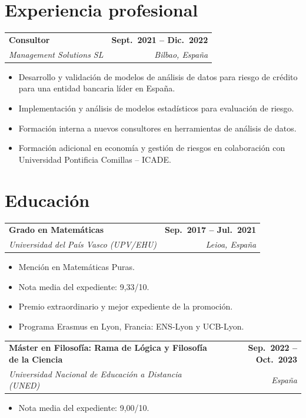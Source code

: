 \documentclass[11pt, a4paper]{article}
\makeatletter
\newcommand{\cventry}[4]{%
  \noindent
  \begin{tabularx}{\linewidth}{@{}X r@{}}
    \textbf{#1} & \textbf{#2}\\
    \textit{#3} & \textit{#4}
  \end{tabularx}%
}
\makeatother
\begin{document}
\newpage

\section{Experiencia profesional}

\cventry{Consultor}%
        {Sept.\ 2021 -- Dic.\ 2022}%
        {Management Solutions SL}%
        {Bilbao, España}
\begin{itemize}[nosep, leftmargin=1.2em, topsep=4pt]
  \item Desarrollo y validación de modelos de análisis de datos para riesgo
        de crédito para una entidad bancaria líder en España.
  \item Implementación y análisis de modelos estadísticos para evaluación de riesgo.
  \item Formación interna a nuevos consultores en herramientas de análisis de datos.
  \item Formación adicional en economía y gestión de riesgos en colaboración con
        Universidad Pontificia Comillas -- ICADE.
\end{itemize}


\section{Educación}



\medskip
\cventry{Grado en Matemáticas}%
        {Sep.\ 2017 -- Jul.\ 2021}%
        {Universidad del País Vasco (UPV/EHU)}%
        {Leioa, España}
\begin{itemize}[nosep, leftmargin=1.2em, topsep=4pt]
  \item Mención en Matemáticas Puras.
  \item Nota media del expediente: 9{,}33/10.
  \item Premio extraordinario y mejor expediente de la promoción.
  \item Programa Erasmus en Lyon, Francia: ENS-Lyon y UCB-Lyon.
\end{itemize}

\medskip
\cventry{Máster en Filosofía: Rama de Lógica y Filosofía de la Ciencia}%
        {Sep.\ 2022 -- Oct.\ 2023}%
        {Universidad Nacional de Educación a Distancia (UNED)}%
        {España}
\begin{itemize}[nosep, leftmargin=1.2em, topsep=4pt]
  \item Nota media del expediente: 9{,}00/10.
\end{itemize}
\end{document}
